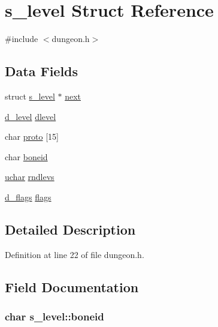 \hypertarget{structs__level}{\section{s\+\_\+level Struct Reference}
\label{structs__level}
}


{\ttfamily \#include $<$dungeon.\+h$>$}

\subsection*{Data Fields}
\begin{DoxyCompactItemize}
\item 
struct \hyperlink{structs__level}{s\+\_\+level} $\ast$ \hyperlink{structs__level_a05f0992e55967b904dd299418a2058da}{next}
\item 
\hyperlink{structd__level}{d\+\_\+level} \hyperlink{structs__level_a34833da474dd639dacf93784e2d18db9}{dlevel}
\item 
char \hyperlink{structs__level_ab678712bf46b72e78ee0f18119bece65}{proto} \mbox{[}15\mbox{]}
\item 
char \hyperlink{structs__level_a440fc05f49167454dedf1b64d814222e}{boneid}
\item 
\hyperlink{config_8h_a65f85814a8290f9797005d3b28e7e5fc}{uchar} \hyperlink{structs__level_acad52c1c9c746baa47b9447bd7faa28f}{rndlevs}
\item 
\hyperlink{structd__flags}{d\+\_\+flags} \hyperlink{structs__level_a4be64684499b0c49bc84fafe05f83aff}{flags}
\end{DoxyCompactItemize}


\subsection{Detailed Description}


Definition at line 22 of file dungeon.\+h.



\subsection{Field Documentation}
\hypertarget{structs__level_a440fc05f49167454dedf1b64d814222e}{
\subsubsection[{boneid}]{\setlength{\rightskip}{0pt plus 5cm}char s\+\_\+level\+::boneid}}\label{structs__level_a440fc05f49167454dedf1b64d814222e}


